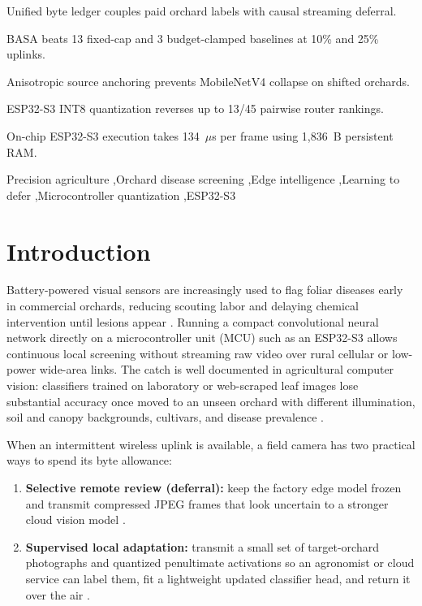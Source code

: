 \documentclass[preprint,12pt,authoryear]{elsarticle}
\begin{document}
\begin{frontmatter}
\begin{highlights}
\item Unified byte ledger couples paid orchard labels with causal streaming deferral.
\item BASA beats 13 fixed-cap and 3 budget-clamped baselines at 10\% and 25\% uplinks.
\item Anisotropic source anchoring prevents MobileNetV4 collapse on shifted orchards.
\item ESP32-S3 INT8 quantization reverses up to 13/45 pairwise router rankings.
\item On-chip ESP32-S3 execution takes 134~$\mu$s per frame using 1,836~B persistent RAM.
\end{highlights}

\begin{keyword}
Precision agriculture \sep Orchard disease screening \sep Edge intelligence \sep Learning to defer \sep Microcontroller quantization \sep ESP32-S3
\end{keyword}

\end{frontmatter}

\linenumbers

\section{Introduction}
\label{sec:intro}

Battery-powered visual sensors are increasingly used to flag foliar diseases early in commercial orchards, reducing scouting labor and delaying chemical intervention until lesions appear \citep{mohanty2016,agri}. Running a compact convolutional neural network directly on a microcontroller unit (MCU) such as an ESP32-S3 allows continuous local screening without streaming raw video over rural cellular or low-power wide-area links. The catch is well documented in agricultural computer vision: classifiers trained on laboratory or web-scraped leaf images lose substantial accuracy once moved to an unseen orchard with different illumination, soil and canopy backgrounds, cultivars, and disease prevalence \citep{mohanty2016,singh2020}.

When an intermittent wireless uplink is available, a field camera has two practical ways to spend its byte allowance:
\begin{enumerate}
  \item \textbf{Selective remote review (deferral):} keep the factory edge model frozen and transmit compressed JPEG frames that look uncertain to a stronger cloud vision model \citep{jitkrittum2023,edgeboost}.
  \item \textbf{Supervised local adaptation:} transmit a small set of target-orchard photographs and quantized penultimate activations so an agronomist or cloud service can label them, fit a lightweight updated classifier head, and return it over the air \citep{tinyol,lin2022}.
\end{enumerate}
\end{document}
